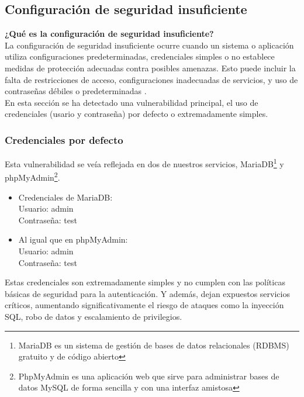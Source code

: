\documentclass[a4paper,12pt]{article}
\begin{document}
\vspace{1em}

\subsection{Configuración de seguridad insuficiente}
\vspace{1em}

\textbf{¿Qué es la configuración de seguridad insuficiente?\\}
La configuración de seguridad insuficiente ocurre cuando un sistema o aplicación utiliza configuraciones predeterminadas, credenciales simples o no establece medidas de protección adecuadas contra posibles amenazas. Esto puede incluir la falta de restricciones de acceso, configuraciones inadecuadas de servicios, y uso de contraseñas débiles o predeterminadas \cite{sec_mis}.\\

En esta sección se ha detectado una vulnerabilidad principal, el uso de credenciales (usario y contraseña) por defecto o extremadamente simples.
\subsubsection{Credenciales por defecto}
Esta vulnerabilidad se veía reflejada en dos de nuestros servicios, MariaDB\footnote{MariaDB es un sistema de gestión de bases de datos relacionales (RDBMS) gratuito y de código abierto} y phpMyAdmin\footnote{PhpMyAdmin es una aplicación web que sirve para administrar bases de datos MySQL de forma sencilla y con una interfaz amistosa}.\\
\begin{itemize}
\item Credenciales de MariaDB:\\
Usuario: admin\\
Contraseña: test\\
\item Al igual que en phpMyAdmin:\\
Usuario: admin\\
Contraseña: test\\
\end{itemize}
Estas credenciales son extremadamente simples y no cumplen con las políticas básicas de seguridad para la autenticación. Y además, dejan expuestos servicios críticos, aumentando significativamente el riesgo de ataques como la inyección SQL, robo de datos y escalamiento de privilegios.
\vspace{1em}
\end{document}
